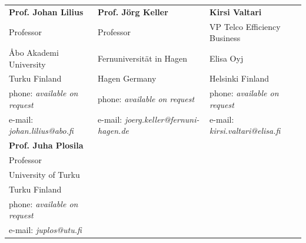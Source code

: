 \documentclass[margin,line]{resume}
\begin{document}
\begin{resume}
\begin{tabular}{@{}p{4.2cm}p{6cm}p{5cm}}
\textbf{Prof. Johan Lilius}       &  \textbf{Prof. J\"{o}rg Keller}	&  \textbf{Kirsi Valtari}                   \\
Professor                               &  Professor & VP Telco Efficiency Business                       \\
\AA{}bo Akademi University                     &  Fernuniversit\"{a}t in Hagen   &   Elisa Oyj                 \\
Turku Finland			           &  Hagen Germany        & Helsinki Finland\\
phone: \textsl{available on request}    &  phone: \textsl{available on request}  &  phone: \textsl{available on request}      \\
e-mail: \textsl{johan.lilius@abo.fi}   &  e-mail: \textsl{joerg.keller@fernuni-hagen.de}  &  e-mail: \textsl{kirsi.valtari@elisa.fi}   \\
\vspace{0.5cm}
\textbf{Prof. Juha Plosila} & &\\
Professor & &\\
University of Turku & &\\
Turku Finland & &\\
phone: \textsl{available on request} & &\\
e-mail: \textsl{juplos@utu.fi} & &\\
\end{tabular}






\end{resume}
\end{document}
